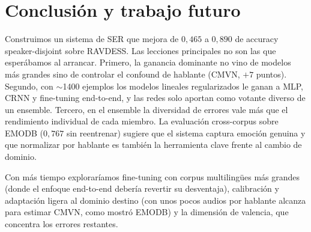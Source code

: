 \documentclass[conference]{IEEEtran}
\begin{document}
\section{Conclusión y trabajo futuro}

Construimos un sistema de SER que mejora de $0{,}465$ a $0{,}890$ de
accuracy speaker-disjoint sobre RAVDESS. Las lecciones principales no son
las que esperábamos al arrancar. Primero, la ganancia dominante no vino de
modelos más grandes sino de controlar el confound de hablante (CMVN, $+7$
puntos). Segundo, con $\sim$1400 ejemplos los modelos lineales regularizados
le ganan a MLP, CRNN y fine-tuning end-to-end, y las redes solo aportan como
votante diverso de un ensemble. Tercero, en el ensemble la diversidad de
errores vale más que el rendimiento individual de cada miembro. La
evaluación cross-corpus sobre EMODB ($0{,}767$ sin reentrenar) sugiere que
el sistema captura emoción genuina y que normalizar por hablante es también
la herramienta clave frente al cambio de dominio.

Con más tiempo exploraríamos fine-tuning con corpus multilingües más grandes
(donde el enfoque end-to-end debería revertir su desventaja), calibración y
adaptación ligera al dominio destino (con unos pocos audios por hablante
alcanza para estimar CMVN, como mostró EMODB) y la dimensión de valencia,
que concentra los errores restantes.
\end{document}
